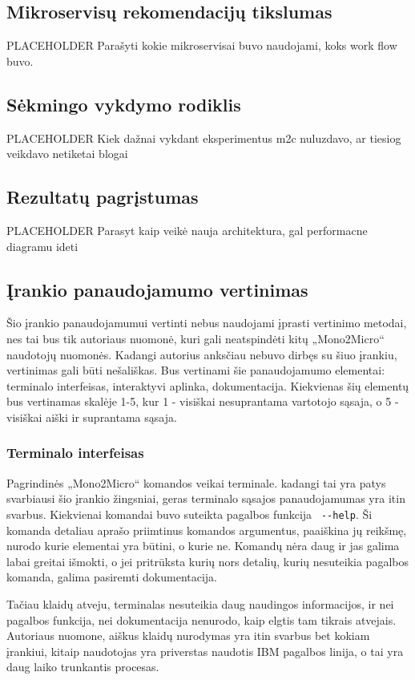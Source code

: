 \documentclass{VUMIFPSbakalaurinis}
\begin{document}
\subsection{Mikroservisų rekomendacijų tikslumas}

PLACEHOLDER Parašyti kokie mikroservisai buvo naudojami, koks work flow buvo.

\subsection{Sėkmingo vykdymo rodiklis}
PLACEHOLDER Kiek dažnai vykdant eksperimentus m2c nuluzdavo, ar tiesiog veikdavo netiketai blogai

\subsection{Rezultatų pagrįstumas}
PLACEHOLDER Parasyt kaip veikė nauja architektura, gal performacne diagramu ideti

\subsection{Įrankio panaudojamumo vertinimas}
Šio įrankio panaudojamumui vertinti nebus naudojami įprasti vertinimo metodai, nes tai bus tik autoriaus nuomonė, kuri gali neatspindėti kitų „Mono2Micro“ naudotojų nuomonės. Kadangi autorius anksčiau nebuvo dirbęs su šiuo įrankiu, vertinimas gali būti nešališkas. Bus vertinami šie panaudojamumo elementai: terminalo interfeisas, interaktyvi aplinka, dokumentacija. Kiekvienas šių elementų bus vertinamas skalėje 1-5, kur 1 - visiškai nesuprantama vartotojo sąsaja, o 5 - visiškai aiški ir suprantama sąsaja.

\subsubsection{Terminalo interfeisas}
Pagrindinės „Mono2Micro“ komandos veikai terminale. kadangi tai yra patys svarbiausi šio įrankio žingsniai, geras terminalo sąsajos panaudojamumas yra itin svarbus. Kiekvienai komandai buvo suteikta pagalbos funkcija \verb| --help|. Ši komanda detaliau aprašo priimtinus komandos argumentus, paaiškina jų reikšmę, nurodo kurie elementai yra būtini, o kurie ne. Komandų nėra daug ir jas galima labai greitai išmokti, o jei pritrūksta kurių nors detalių, kurių nesuteikia pagalbos komanda, galima pasiremti dokumentacija.

Tačiau klaidų atveju, terminalas nesuteikia daug naudingos informacijos, ir nei pagalbos funkcija, nei dokumentacija nenurodo, kaip elgtis tam tikrais atvejais. Autoriaus nuomone, aiškus klaidų nurodymas yra itin svarbus bet kokiam įrankiui, kitaip naudotojas yra priverstas naudotis IBM pagalbos linija, o tai yra daug laiko trunkantis procesas.
\end{document}
